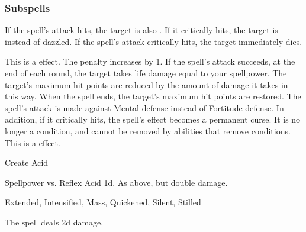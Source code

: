 \subsubsection{Subspells}
If the spell's attack hits, the target is also \dazzled. If it critically hits, the target is \blinded instead of dazzled.
If the spell's attack critically hits, the target immediately dies.
\par
This is a  effect.
The penalty increases by 1.
If the spell's attack succeeds, at the end of each round, the target takes life damage equal to your spellpower.
The target's maximum hit points are reduced by the amount of damage it takes in this way.
When the spell ends, the target's maximum hit points are restored.
The spell's attack is made against Mental defense instead of Fortitude defense.
In addition, if it critically hits, the spell's effect becomes a permanent curse.
It is no longer a condition, and cannot be removed by abilities that remove conditions.
This is a  effect.
\begin{spellsection}{Create Acid}
\begin{spellheader}
\end{spellheader}
\begin{spellcontent}
\begin{spelltargetinginfo}
\end{spelltargetinginfo}
\begin{spelleffects}
\begin{spellattack}{Spellpower vs. Reflex}
\spellsuccess Acid  \plus1d.
\spellcritical As above, but double damage.
\end{spellattack}
\end{spelleffects}
\end{spellcontent}
\begin{spellfooter}
 Extended, Intensified, Mass, Quickened, Silent, Stilled
\end{spellfooter}
\begin{spellsubcontent}
\begin{spellcantrip}
The spell deals \minus2d damage.
\end{spellcantrip}
\end{spellsubcontent}
\end{spellsection}
